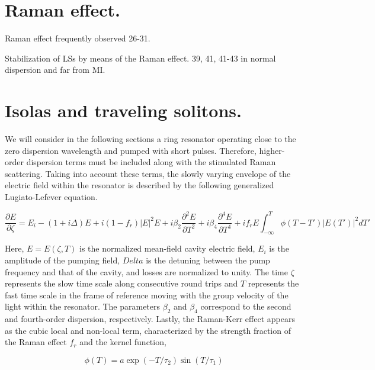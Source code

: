 \section{Raman effect.}

Raman effect frequently observed 26-31. 

Stabilization of LSs by means of the Raman effect. 39, 41, 41-43 in normal dispersion and far from MI. 

\section{Isolas and traveling solitons.}

We will consider in the following sections a ring resonator operating close to the zero dispersion wavelength and pumped
with short pulses. Therefore, higher-order dispersion terms must be included along with the stimulated
Raman scattering. Taking into account these terms, the slowly varying envelope of the electric field within the
resonator is described by the following generalized Lugiato-Lefever equation.

\begin{equation}
    \dfrac{\partial E}{\partial \zeta} = E_i - (1 + i\Delta)E + i(1 - f_r)|E|^2 E 
                            + i \beta_2 \dfrac{\partial^2 E}{\partial T^2} + i \beta_4 \dfrac{\partial^4 E}{\partial T^4}
                            + i f_r E \int_{-\infty}^T \phi(T-T') |E(T')|^2 dT'
    \label{lle:glle}
\end{equation}             

Here, $E = E(\zeta, T)$ is the normalized mean-field cavity electric field, $E_i$ is the amplitude of the pumping field,
$Delta$ is the detuning between the pump frequency and that of the cavity, and losses are normalized to unity. The time $\zeta$ represents the
slow time scale along consecutive round trips and $T$ represents the fast time scale in the frame of reference
moving with the group velocity of the light within the resonator. The parameters $\beta_2$ and $\beta_4$ correspond to the
second and fourth-order dispersion, respectively. Lastly, the Raman-Kerr effect appears as the cubic local and non-local term,
characterized by the strength fraction of the Raman effect $f_r$ and the kernel function,

\begin{equation}
    \phi(T) = a \exp (-T / \tau_2) \sin (T / \tau_1)
    \label{lle:kernel}
\end{equation}

